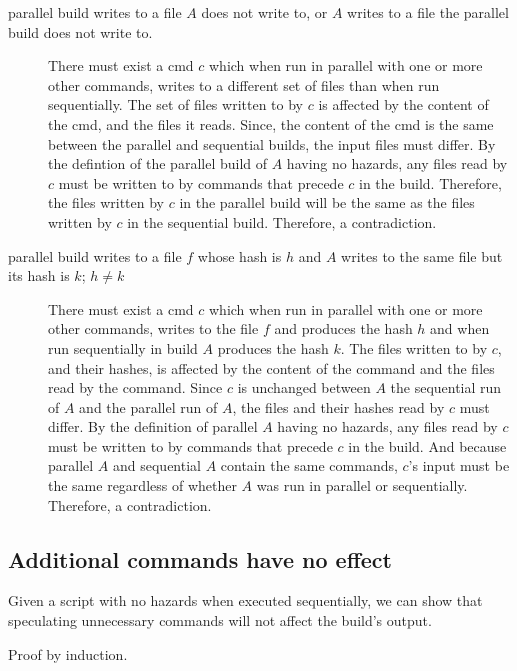 \begin{description}
\item [parallel build writes to a file $A$ does not write to, or $A$ writes to a file the parallel build does not write to.]
  There must exist a cmd $c$ which when run in parallel with one or more other commands, writes to a different set of files than when run sequentially.  The set of files written to by $c$ is affected by the content of the cmd, and the files it reads.  Since, the content of the cmd is the same between the parallel and sequential builds, the input files must differ.
  By the defintion of the parallel build of $A$ having no hazards, any files read by $c$ must be written to by commands that precede $c$ in the build.  Therefore, the files written by $c$ in the parallel build will be the same as the files written by $c$ in the sequential build.  Therefore, a contradiction.

  
\item [parallel build writes to a file $f$ whose hash is $h$ and $A$ writes to the same file but its hash is $k$; $h \neq k$]
  There must exist a cmd $c$ which when run in parallel with one or more other commands, writes to the file $f$ and produces the hash $h$ and when run sequentially in build $A$ produces the hash $k$.
  The files written to by $c$, and their hashes, is affected by the content of the command and the files read by the command.  Since $c$ is unchanged between $A$ the sequential run of $A$ and the parallel run of $A$, the files and their hashes read by $c$ must differ.  By the definition of parallel $A$ having no hazards, any files read by $c$ must be written to by commands that precede $c$ in the build.  And because parallel $A$ and sequential $A$ contain the same commands, $c$'s input must be the same regardless of whether $A$ was run in parallel or sequentially.  Therefore, a contradiction.

\end{description}



\subsection{Additional commands have no effect}
\label{sec:proof:additional}

Given a script with no hazards when executed sequentially, we can show that speculating unnecessary commands will not affect the build's output. %

Proof by induction.

